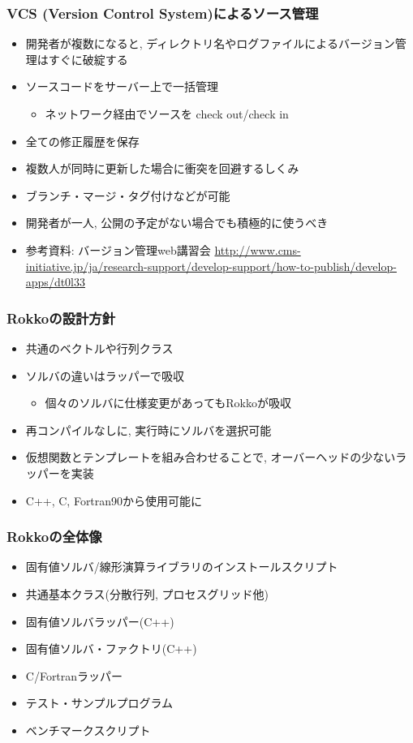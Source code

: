 \begin{frame}
  \frametitle{VCS (Version Control System)によるソース管理}
  \begin{itemize}
  \item 開発者が複数になると, ディレクトリ名やログファイルによるバージョン管理はすぐに破綻する
  \item ソースコードをサーバー上で一括管理
    \begin{itemize}
    \item ネットワーク経由でソースを check out/check in
    \end{itemize}
  \item 全ての修正履歴を保存
  \item 複数人が同時に更新した場合に衝突を回避するしくみ
  \item ブランチ・マージ・タグ付けなどが可能
  \item 開発者が一人, 公開の予定がない場合でも積極的に使うべき
  \item 参考資料: バージョン管理web講習会 {\tiny
      \url{http://www.cms-initiative.jp/ja/research-support/develop-support/how-to-publish/develop-apps/dt0l33}}
  \end{itemize}
\end{frame}

\begin{frame}
  \frametitle{Rokkoの設計方針}
  \begin{itemize}
    \setlength{\itemsep}{1em}
  \item 共通のベクトルや行列クラス
  \item ソルバの違いはラッパーで吸収
    \begin{itemize}
    \item 個々のソルバに仕様変更があってもRokkoが吸収
    \end{itemize}
  \item 再コンパイルなしに, 実行時にソルバを選択可能
  \item 仮想関数とテンプレートを組み合わせることで, オーバーヘッドの少ないラッパーを実装
  \item C++, C, Fortran90から使用可能に
  \end{itemize}
\end{frame}

\begin{frame}
  \frametitle{Rokkoの全体像}
  \begin{itemize}
  \item 固有値ソルバ/線形演算ライブラリのインストールスクリプト
  \item 共通基本クラス(分散行列, プロセスグリッド他)
  \item 固有値ソルバラッパー(C++)
  \item 固有値ソルバ・ファクトリ(C++)
  \item C/Fortranラッパー
  \item テスト・サンプルプログラム
  \item ベンチマークスクリプト
  \end{itemize}
\end{frame}

